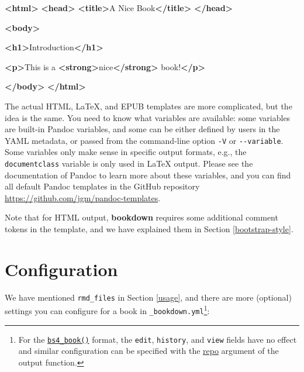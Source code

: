 \documentclass[
  12pt,
]{krantz}
\newenvironment{Shaded}{\begin{snugshade}}{\end{snugshade}}
\newcommand{\KeywordTok}[1]{\textcolor[rgb]{0.13,0.29,0.53}{\textbf{#1}}}
\newcommand{\NormalTok}[1]{#1}
\begin{document}
\begin{Shaded}
\begin{Highlighting}[]
\KeywordTok{\textless{}html\textgreater{}}
  \KeywordTok{\textless{}head\textgreater{}}
    \KeywordTok{\textless{}title\textgreater{}}\NormalTok{A Nice Book}\KeywordTok{\textless{}/title\textgreater{}}
  \KeywordTok{\textless{}/head\textgreater{}}
  
  \KeywordTok{\textless{}body\textgreater{}}
  
  \KeywordTok{\textless{}h1\textgreater{}}\NormalTok{Introduction}\KeywordTok{\textless{}/h1\textgreater{}}
  
  \KeywordTok{\textless{}p\textgreater{}}\NormalTok{This is a }\KeywordTok{\textless{}strong\textgreater{}}\NormalTok{nice}\KeywordTok{\textless{}/strong\textgreater{}}\NormalTok{ book!}\KeywordTok{\textless{}/p\textgreater{}}
  
  \KeywordTok{\textless{}/body\textgreater{}}
\KeywordTok{\textless{}/html\textgreater{}}
\end{Highlighting}
\end{Shaded}

The actual HTML, LaTeX, and EPUB templates are more complicated, but the idea is the same. You need to know what variables are available: some variables are built-in Pandoc variables, and some can be either defined by users in the YAML metadata, or passed from the command-line option \texttt{-V} or \texttt{-\/-variable}. Some variables only make sense in specific output formats, e.g., the \texttt{documentclass} variable is only used in LaTeX output. Please see the documentation of Pandoc to learn more about these variables, and you can find all default Pandoc templates in the GitHub repository \url{https://github.com/jgm/pandoc-templates}.

Note that for HTML output, \textbf{bookdown} requires some additional comment tokens in the template, and we have explained them in Section \ref{bootstrap-style}.

\hypertarget{configuration}{%
\section{Configuration}\label{configuration}}

We have mentioned \texttt{rmd\_files} in Section \ref{usage}, and there are more (optional) settings you can configure for a book in \texttt{\_bookdown.yml}\footnote{For the \protect\hyperlink{bs4-book}{\texttt{bs4\_book()}} format, the \texttt{edit}, \texttt{history}, and \texttt{view} fields have no effect and similar configuration can be specified with the \protect\hyperlink{specifying-the-repository}{repo} argument of the output function.}:
\end{document}
